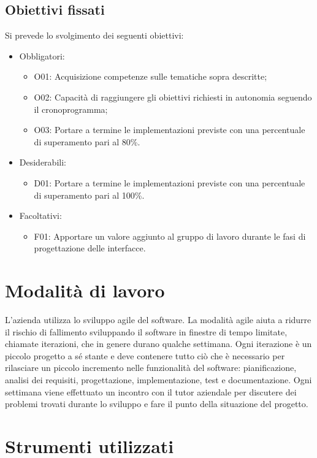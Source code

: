 \subsection{Obiettivi fissati}
Si prevede lo svolgimento dei seguenti obiettivi:
\begin{itemize}
    \item Obbligatori:
    \begin{itemize}
        \item O01: Acquisizione competenze sulle tematiche sopra descritte;
        \item O02: Capacità di raggiungere gli obiettivi richiesti in autonomia seguendo il cronoprogramma;
        \item O03: Portare a termine le implementazioni previste con una percentuale di superamento pari al 80\%.
    \end{itemize}
    \item Desiderabili:
     \begin{itemize}
        \item D01: Portare a termine le implementazioni previste con una percentuale di superamento pari al 100\%.
     \end{itemize}
     \item Facoltativi:
     \begin{itemize}
        \item F01: Apportare un valore aggiunto al gruppo di lavoro durante le fasi di progettazione delle interfacce.
     \end{itemize}
\end{itemize}


\section{Modalità di lavoro}
L'azienda utilizza lo sviluppo agile del software. La modalità agile aiuta a ridurre il rischio di fallimento sviluppando il software in finestre di tempo limitate, chiamate iterazioni, che in genere durano qualche settimana. Ogni iterazione è un piccolo progetto a sé stante e deve contenere tutto ciò che è necessario per rilasciare un piccolo incremento nelle funzionalità del software: pianificazione, analisi dei requisiti, progettazione, implementazione, test e documentazione. Ogni settimana viene effettuato un incontro con il tutor aziendale per discutere dei problemi trovati durante lo sviluppo e fare il punto della situazione del progetto.

\section{Strumenti utilizzati}
